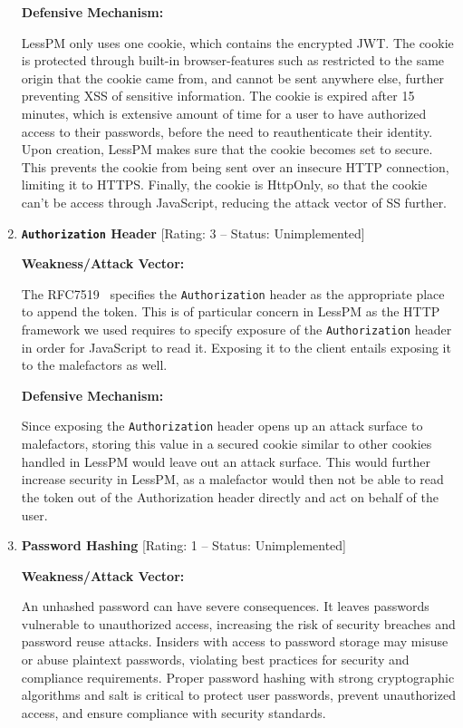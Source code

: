 \begin{enumerate}[label=$\blacktriangleright$]
  \textbf{Defensive Mechanism:}

  LessPM only uses one cookie, which contains the encrypted JWT\@.
  The cookie is protected through built-in browser-features such as
  restricted to the same origin that the cookie came from, and cannot be sent
  anywhere else, further preventing XSS of sensitive information\@.
  The cookie is expired after 15 minutes, which is extensive amount of time
  for a user to have authorized access to their passwords, before the need to
  reauthenticate their identity.
  Upon creation, LessPM makes sure that the cookie becomes set to secure.
  This prevents the cookie from being sent over an insecure HTTP connection,
  limiting it to HTTPS\@.
  Finally, the cookie is HttpOnly, so that the cookie can't be access through
  JavaScript, reducing the attack vector of SS further.

  \item \textbf{\texttt{Authorization} Header}
  [Rating: 3 -- Status: Unimplemented]
  
  \textbf{Weakness/Attack Vector:}

  The RFC7519~\cite{RFC7519} specifies the \texttt{Authorization} header as
  the appropriate place to append the token.
  This is of particular concern in LessPM as the HTTP framework we used requires
  to specify exposure of the \texttt{Authorization} header in order for
  JavaScript to read it.
  Exposing it to the client entails exposing it to the malefactors as well.

  \textbf{Defensive Mechanism:}

  Since exposing the \texttt{Authorization} header opens up an attack surface
  to malefactors, storing this value in a secured cookie similar to other
  cookies handled in LessPM would leave out an attack surface.
  This would further increase security in LessPM, as a malefactor would then
  not be able to read the token out of the Authorization header directly and
  act on behalf of the user.

  \item \textbf{Password Hashing} [Rating: 1 -- Status: Unimplemented]

  \textbf{Weakness/Attack Vector:}

  An unhashed password can have severe consequences.
  It leaves passwords vulnerable to unauthorized access, increasing the risk of
  security breaches and password reuse attacks.
  Insiders with access to password storage may misuse or abuse plaintext
  passwords, violating best practices for security and compliance requirements.
  Proper password hashing with strong cryptographic algorithms and salt is
  critical to protect user passwords, prevent unauthorized access, and ensure
  compliance with security standards.


\end{enumerate}
